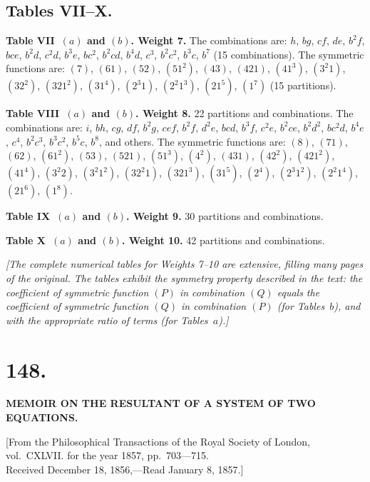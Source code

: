 \documentclass[11pt,a4paper]{article}
\begin{document}
\newpage
\subsection*{Tables VII--X.}

\textbf{Table VII~$(a)$ and $(b)$. Weight 7.} The combinations are:
$h$, $bg$, $cf$, $de$, $b^2 f$, $bce$, $b^2 d$, $c^2 d$, $b^3 e$, $bc^2$,
$b^2 cd$, $b^4 d$, $c^3$, $b^2 c^2$, $b^3 c$, $b^7$ (15 combinations).
The symmetric functions are: $(7)$, $(61)$, $(52)$, $(51^2)$, $(43)$, $(421)$,
$(41^3)$, $(3^2 1)$, $(32^2)$, $(321^2)$, $(31^4)$, $(2^3 1)$, $(2^2 1^3)$,
$(21^5)$, $(1^7)$ (15 partitions).

\textbf{Table VIII~$(a)$ and $(b)$. Weight 8.} 22 partitions and combinations.
The combinations are: $i$, $bh$, $cg$, $df$, $b^2 g$, $cef$, $b^2 f$, $d^2 e$,
$bcd$, $b^3 f$, $c^2 e$, $b^2 ce$, $b^2 d^2$, $bc^2 d$, $b^4 e$, $c^4$,
$b^2 c^3$, $b^3 c^2$, $b^5 c$, $b^8$, and others.
The symmetric functions are: $(8)$, $(71)$, $(62)$, $(61^2)$, $(53)$, $(521)$,
$(51^3)$, $(4^2)$, $(431)$, $(42^2)$, $(421^2)$, $(41^4)$, $(3^2 2)$,
$(3^2 1^2)$, $(32^2 1)$, $(321^3)$, $(31^5)$, $(2^4)$, $(2^3 1^2)$,
$(2^2 1^4)$, $(21^6)$, $(1^8)$.

\textbf{Table IX~$(a)$ and $(b)$. Weight 9.} 30 partitions and combinations.

\textbf{Table X~$(a)$ and $(b)$. Weight 10.} 42 partitions and combinations.

\textit{[The complete numerical tables for Weights 7--10 are extensive, filling
many pages of the original. The tables exhibit the symmetry property described
in the text: the coefficient of symmetric function $(P)$ in combination $(Q)$
equals the coefficient of symmetric function $(Q)$ in combination $(P)$ (for
Tables~$b$), and with the appropriate ratio of terms (for Tables~$a$).]}

\newpage
\section*{148.}
\begin{center}
\Large\bfseries
MEMOIR ON THE RESULTANT OF A SYSTEM OF TWO EQUATIONS.
\end{center}

\begin{flushright}
\small
[From the Philosophical Transactions of the Royal Society of London,\\
vol.~CXLVII. for the year 1857, pp.~703---715.\\
Received December 18, 1856,---Read January 8, 1857.]
\end{flushright}
\end{document}
